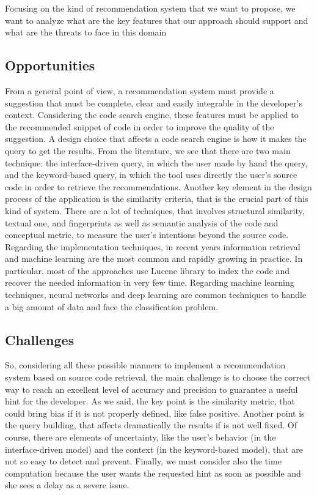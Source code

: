 Focusing on the kind of recommendation system that we want to propose, we want to analyze what are the key features that our approach should support and what are the threats to face in this domain


\subsection{Opportunities}
From a general point of view, a recommendation system must provide a suggestion that must be complete, clear and easily integrable in the developer's context. Considering the code search engine, these features must be applied to the recommended snippet of code in order to improve the quality of the suggestion. A design choice that affects a code search engine is how it makes the query to get the results. From the literature, we see that there are two main technique: the interface-driven query, in which the user made by hand the query, and the keyword-based query, in which the tool uses directly the user's source code in order to retrieve the recommendations. Another key element in the design process of the application is the similarity criteria, that is the crucial part of this kind of system. There are a lot of techniques, that involves structural similarity, textual one, and fingerprints as well as semantic analysis of the code and conceptual metric, to measure the user's intentions beyond the source code. Regarding the implementation techniques, in recent years information retrieval and machine learning are the most common and rapidly growing in practice. In particular, most of the approaches use Lucene library to index the code and recover the needed information in very few time. Regarding machine learning techniques, neural networks and deep learning are common techniques to handle a big amount of data and face the classification problem. 

\subsection{Challenges}
So, considering all these possible manners to implement a recommendation system based on source code retrieval,  the main challenge is to choose the correct way to reach an excellent level of accuracy and precision to guarantee a useful hint for the developer. As we said, the key point is the similarity metric, that could bring bias if it is not properly defined, like false positive. Another point is the query building, that affects dramatically the results if is not well fixed. Of course, there are elements of uncertainty, like the user's behavior (in the interface-driven model) and the context (in the keyword-based model), that are not so easy to detect and prevent. Finally, we must consider also the time computation because the user wants the requested hint as soon as possible and she sees a delay as a severe issue. 

